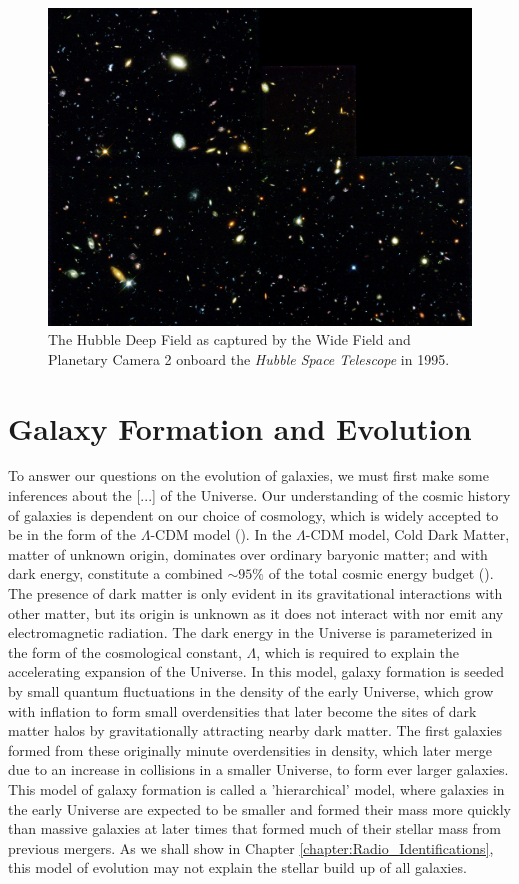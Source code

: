 \begin{figure}
    \centering
	\includegraphics[width=0.9\columnwidth]{Figures/hubble_deep_field.pdf}
	\caption[Hubble Deep Field as captured by the \textit{Hubble Space Telescope}]{The Hubble Deep Field as captured by the Wide Field and Planetary Camera 2 onboard the \textit{Hubble Space Telescope} in 1995.}
	\label{fig:hubble_deep_field}
\end{figure}

\section{Galaxy Formation and Evolution}

To answer our questions on the evolution of galaxies, we must first make some inferences about the {\color{red}[...]} of the Universe. Our understanding of the cosmic history of galaxies is dependent on our choice of cosmology, which is widely accepted to be in the form of the $\Lambda$-CDM model (\citealt{Peebles_1980}). In the $\Lambda$-CDM model, Cold Dark Matter, matter of unknown origin, dominates over ordinary baryonic matter; and with dark energy, constitute a combined $\sim 95\%$ of the total cosmic energy budget (\citealt{Fukugita_2004}). The presence of dark matter is only evident in its gravitational interactions with other matter, but its origin is unknown as it does not interact with nor emit any electromagnetic radiation. The dark energy in the Universe is parameterized in the form of the cosmological constant, $\Lambda$, which is required to explain the accelerating expansion of the Universe. In this model, galaxy formation is seeded by small quantum fluctuations in the density of the early Universe, which grow with inflation to form small overdensities that later become the sites of dark matter halos by gravitationally attracting nearby dark matter. The first galaxies formed from these originally minute overdensities in density, which later merge due to an increase in collisions in a smaller Universe, to form ever larger galaxies. This model of galaxy formation is called a 'hierarchical' model, where galaxies in the early Universe are expected to be smaller and formed their mass more quickly than massive galaxies at later times that formed much of their stellar mass from previous mergers. As we shall show in Chapter \ref{chapter:Radio_Identifications}, this model of evolution may not explain the stellar build up of all galaxies.

